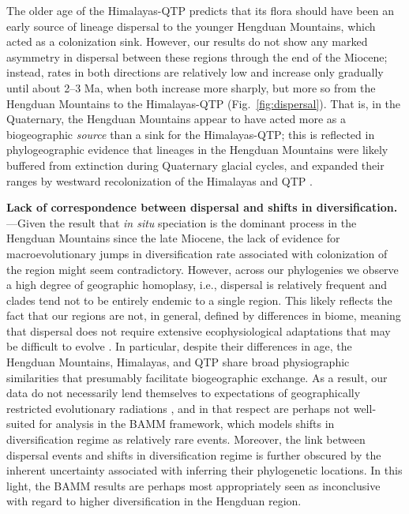 
The older age of the Himalayas-QTP predicts that its flora should have been an early source of lineage dispersal to the younger Hengduan Mountains, which acted as a colonization sink. However, our results do not show any marked asymmetry in dispersal between these regions through the end of the Miocene; instead, rates in both directions are relatively low and increase only gradually until about 2--3 Ma, when both increase more sharply, but more so from the Hengduan Mountains to the Himalayas-QTP (Fig.~\ref{fig:dispersal}). That is, in the Quaternary, the Hengduan Mountains appear to have acted more as a biogeographic \textit{source} than a sink for the Himalayas-QTP; this is reflected in phylogeographic evidence that lineages in the Hengduan Mountains were likely buffered from extinction during Quaternary glacial cycles, and expanded their ranges by westward recolonization of the Himalayas and QTP \citep[e.g.,][]{WangBS2011,CunY2010}. 


\textbf{Lack of correspondence between dispersal and shifts in diversification.}---Given the result that \textit{in situ} speciation is the dominant process in the Hengduan Mountains since the late Miocene, the lack of evidence for macroevolutionary jumps in diversification rate associated with colonization of the region might seem contradictory. However, across our phylogenies we observe a high degree of geographic homoplasy, i.e., dispersal is relatively frequent and clades tend not to be entirely endemic to a single region. This likely reflects the fact that our regions are not, in general, defined by differences in biome, meaning that dispersal does not require extensive ecophysiological adaptations that may be difficult to evolve \citep{Donoghue2014}. In particular, despite their differences in age, the Hengduan Mountains, Himalayas, and QTP share broad physiographic similarities that presumably facilitate biogeographic exchange. As a result, our data do not necessarily lend themselves to expectations of geographically restricted evolutionary radiations \citep[cf.][]{Hughes2006}, and in that respect are perhaps not well-suited for analysis in the BAMM framework, which models shifts in diversification regime as relatively rare events. Moreover, the link between dispersal events and shifts in diversification regime is further obscured by the inherent uncertainty associated with inferring their phylogenetic locations. In this light, the BAMM results are perhaps most appropriately seen as inconclusive with regard to higher diversification in the Hengduan region.

